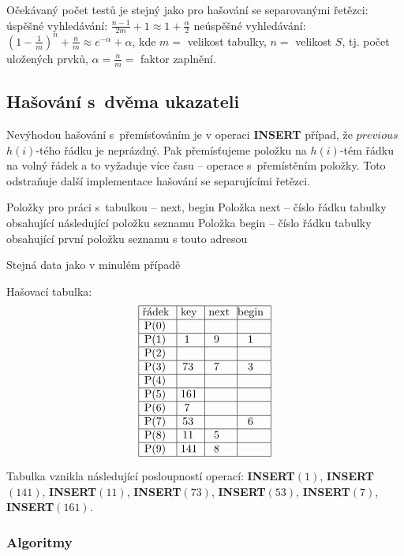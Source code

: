 \documentclass[a4paper,12pt]{article}
\begin{document}
Očekávaný počet testů je stejný jako pro 
hašování se se\-pa\-ro\-va\-ný\-mi řetězci:\newline 
\phantom{---}úspěšné vyhledávání: $\frac {n-1}{
2m}+1\approx 1+\frac {\alpha}2$\newline 
\phantom{---}neúspěšné vyhledávání: $(1-\frac 1
m)^n+\frac nm\approx e^{-\alpha}+\alpha$,\newline 
kde $m=$ velikost tabulky, $n=$ velikost $S$, tj. počet uložených 
prvků, $\alpha =\frac nm=$ faktor zaplnění.

\subsection{Hašování s~dvěma ukazateli}

Nevýhodou hašování s~přemísťováním je v operaci 
{\bf INSERT} případ, že $previous$ $h(i)$-tého řádku je neprázdný. Pak přemísťujeme položku na $h(i)$-tém řádku na volný řádek a to vyžaduje více času -- operace s~přemístěním 
položky. Toto odstraňuje další implementace hašování se 
separujícími řetězci.

Položky pro práci s~tabulkou -- next, 
begin\newline 
\phantom{---}Položka next -- číslo řádku tabulky obsahující 
následující polož\-ku seznamu\newline 
\phantom{---}Položka begin -- číslo řádku tabulky obsahující první položku seznamu 
s touto adresou\newline 

Stejná data jako v minulém případě\newline 

Hašovací tabulka:
$$\vtop{\offinterlineskip\halign {\strut\vrule\ # & \vrule\ # & \vrule\ # & \vrule \hfil # \hfil \vrule\cr\noalign{\hrule}řádek & key & next & begin \hfil \cr\noalign{\hrule}P(0) & & & \hfill \cr\noalign{\hrule}P(1) & 1 & 9 & 1 \cr\noalign{\hrule}P(2) & & & \hfill \cr\noalign{\hrule}P(3) & 73 & 7 & 3 \cr\noalign{\hrule}P(4) & & &\hfill \cr\noalign{\hrule}P(5) & 161 & & \hfill \cr\noalign{\hrule}P(6) & 7 & & \hfill \cr\noalign{\hrule}P(7) & 53 & & 6 \cr\noalign{\hrule}P(8) & 11 & 5 & \hfill \cr\noalign{\hrule}P(9) & 141 & 8 & \hfill \cr\noalign{\hrule}}}$$

Tabulka vznikla následující posloupností 
operací:\newline 
{\bf INSERT$(1)$}, {\bf INSERT$(141)$}, {\bf INSERT$(11)$}, {\bf INSERT$
(73)$}, 
{\bf INSERT$(53)$}, {\bf INSERT$(7)$}, {\bf INSERT$(161)$}. 

\subsubsection{Algoritmy}
\end{document}
